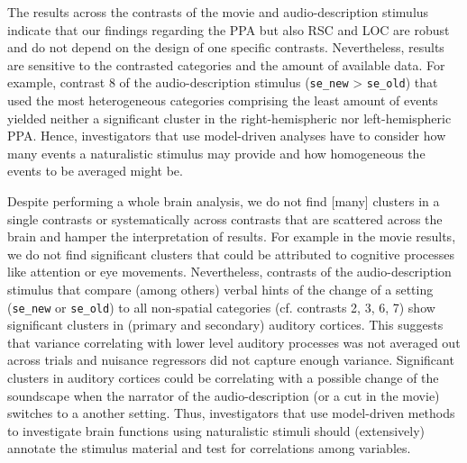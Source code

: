 \documentclass[english]{article}
\begin{document}

The results across the contrasts of the movie and audio-description stimulus indicate that our
findings regarding the PPA but also RSC and LOC are robust and do not depend on
the design of one specific contrasts.
Nevertheless, results are sensitive to the contrasted categories and the amount
of available data.
For example, contrast 8 of the audio-description stimulus (\texttt{se\_new} > \texttt{se\_old})
that used the most heterogeneous categories comprising the least amount of
events yielded neither a significant cluster in the right-hemispheric nor
left-hemispheric PPA.
Hence, investigators that use model-driven analyses have to consider how many
events a naturalistic stimulus may provide and how homogeneous the events to be
averaged might be.


Despite performing a whole brain analysis, we do not find [many] clusters
in a single contrasts or systematically across contrasts that are scattered
across the brain and hamper the interpretation of results.
For example in the movie results, we do not find significant clusters that could be
attributed to cognitive processes like attention or eye movements.
Nevertheless, contrasts of the audio-description stimulus that compare (among others) verbal
hints of the change of a setting (\texttt{se\_new} or \texttt{se\_old}) to all
non-spatial categories (cf. contrasts 2, 3, 6, 7) show significant clusters in
(primary and secondary) auditory cortices.
This suggests that variance correlating with lower level auditory processes was
not averaged out across trials and nuisance regressors did not capture enough
variance.
Significant clusters in auditory cortices could be correlating with a possible
change of the soundscape when the narrator of the audio-description (or a cut in
the movie) switches to a another setting.
Thus, investigators that use model-driven methods to investigate brain functions
using naturalistic stimuli should (extensively) annotate the stimulus material
and test for correlations among variables.
\end{document}
